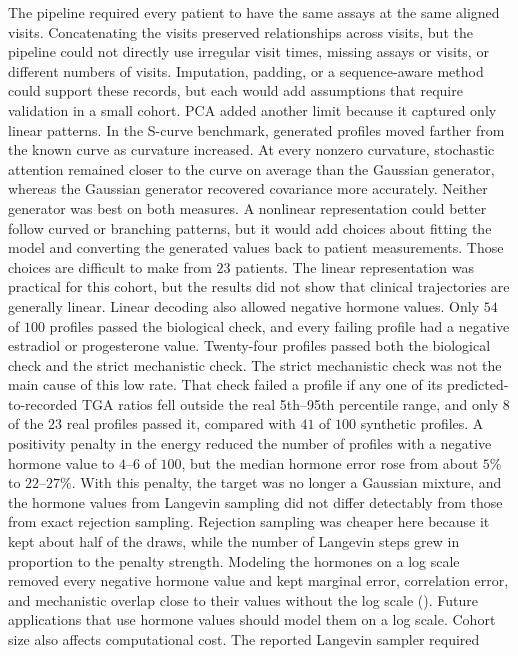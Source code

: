The pipeline required every patient to have the same assays at the same aligned visits.
Concatenating the visits preserved relationships across visits, but the pipeline could not
directly use irregular visit times, missing assays or visits, or different numbers of visits.
Imputation, padding, or a sequence-aware method could support these records, but each would
add assumptions that require validation in a small cohort.
PCA added another limit because it captured only linear patterns. In the S-curve
benchmark, generated profiles moved farther from the known curve as curvature increased.
At every nonzero curvature, stochastic attention remained closer to the curve on average
than the Gaussian generator, whereas the Gaussian generator recovered covariance more
accurately. Neither generator was best on both measures. A nonlinear representation could
better follow curved or branching patterns, but it would add choices about fitting the model
and converting the generated values back to patient measurements. Those choices are
difficult to make from $23$ patients. The linear representation was practical for this
cohort, but the results did not show that clinical trajectories are generally linear.
Linear decoding also allowed negative hormone values. Only $54$ of $100$ profiles
passed the biological check, and every failing profile had a negative estradiol or
progesterone value. Twenty-four profiles passed both the biological check and the strict
mechanistic check. The strict mechanistic check was not the main cause of this low rate. That check failed
a profile if any one of its predicted-to-recorded TGA ratios fell outside the real 5th--95th
percentile range, and only $8$ of the $23$ real profiles passed it, compared with $41$ of $100$
synthetic profiles. A positivity penalty in the energy reduced the number of
profiles with a negative hormone value to $4$--$6$ of $100$, but the median hormone error rose
from about $5\%$ to $22$--$27\%$. With this penalty, the target was no longer a Gaussian
mixture, and the hormone values from Langevin sampling did not differ detectably from those
from exact rejection sampling. Rejection sampling was
cheaper here because it kept about half of the draws, while the number of Langevin steps grew
in proportion to the penalty strength. Modeling the hormones on a log scale removed every
negative hormone value and kept marginal error, correlation error, and mechanistic overlap close to
their values without the log scale (). Future applications that use
hormone values should model them on a log scale.
Cohort size also affects computational cost. The reported Langevin sampler required
